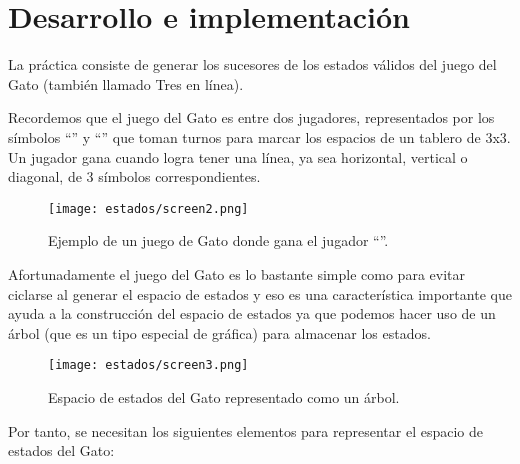\section{Desarrollo e implementaci\'on}

La práctica consiste de generar los sucesores de los estados válidos del juego del Gato (también llamado Tres en línea).\par
Recordemos que el juego del Gato es entre dos jugadores, representados por los símbolos \enquote{} y \enquote{} que toman turnos para marcar los espacios de un tablero de 3x3.
Un jugador gana cuando logra tener una línea, ya sea horizontal, vertical o diagonal, de 3 símbolos correspondientes.\par

\begin{figure}
  \centering
  \texttt{[image: estados/screen2.png]}
  \caption{Ejemplo de un juego de Gato donde gana el jugador \enquote{}. \protect\footnotemark}
  \label{fig:tictactoe}
\end{figure}


Afortunadamente el juego del Gato es lo bastante simple como para evitar ciclarse al generar el espacio de estados y eso es una característica importante que ayuda a la construcción del espacio de estados ya que  podemos hacer uso de un árbol (que es un tipo especial de gráfica) para almacenar los estados.\par


\begin{figure}
  \centering
  \texttt{[image: estados/screen3.png]}
  \caption{Espacio de estados del Gato representado como un árbol.}
  \label{fig:espaciogato}
\end{figure}

Por tanto, se necesitan los siguientes elementos para representar el espacio de estados del Gato:

